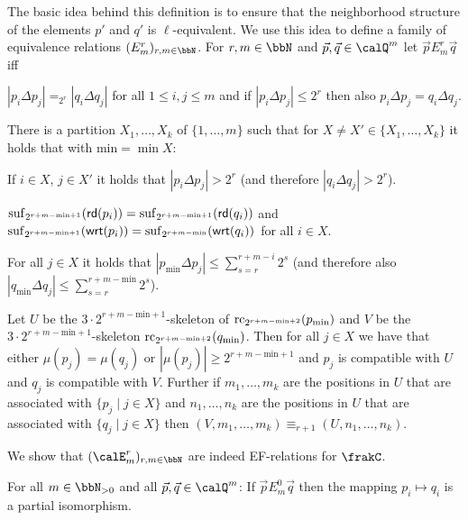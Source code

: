The basic idea behind this definition is to ensure that the neighborhood structure of the elements $p'$ and $q'$ is $\ell$-equivalent. We use this idea to  define a family of  equivalence relations $(E^r_m)_{r,m\in\bbN}$.
For $r,m\in \bbN$ and $\vec{p},\vec{q}\in \Qx^m$ let $\vec{p} E^r_m \vec{q}$ iff
\begin{bracketenumerate}
	\item\label{item:E_distance} $|p_i \Delta p_j| =_{2^r} |q_i\Delta q_j|$ for all $1\leq i, j\leq m$ and if $|p_i\Delta p_j| \leq 2^r$ then also $p_i \Delta p_j = q_i\Delta q_j$. 
	\item\label{item:E_partition} There is a partition $X_1,\ldots,X_k$ of $\{1,\ldots,m\}$ such that for $X\neq X'\in \{X_1,\ldots,X_k\}$ it holds that with $\text{min} = \min X$: 
	\begin{alphaenumerate}
		\item\label{item:part_distance} If $i\in X$, $j\in X'$ it holds that $|p_i\Delta p_j| > 2^r$ (and therefore $|q_i\Delta q_j| > 2^r$).
		\item\label{item:E_suffix} $\operatorname{suf}_{2^{r+m-\text{min}+1}}(\mathsf{rd}(p_i)) = \operatorname{suf}_{2^{r+m-\text{min}+1}}(\mathsf{rd}(q_i))$ and \\$\operatorname{suf}_{2^{r+m-\text{min}+1}}(\mathsf{wrt}(p_i)) = \operatorname{suf}_{2^{r+m-\text{min}}}(\mathsf{wrt}(q_i))$ for all $i\in X$.
		\item For all $j\in X$ it holds that $|p_\text{min} \Delta p_j| \leq \sum_{s= r}^{r+m-i} 2^s$ (and therefore also $|q_\text{min} \Delta q_j| \leq \sum_{s= r}^{r+m-\text{min}} 2^s$).
		\item\label{subitem:E_partition:equivalence} Let $U$ be the $3\cdot 2^{r+m-\text{min}+1}$-skeleton of $\operatorname{rc}_{2^{r+m-\text{min}+2}}(p_\text{min})$ and $V$ be the $3\cdot 2^{r+m-\text{min}+1}$-skeleton $\operatorname{rc}_{2^{r+m-\text{min}+2}}(q_\text{min})$. Then for all 
		$j\in X$ we have that either $\mu(p_j) = \mu(q_j)$ or $|\mu(p_j)| \geq 2^{r+m-\text{min}+1}$ and $p_j$ is compatible with $U$ and $q_j$ is compatible with $V$. Further if $m_1,\ldots, m_k$ are the positions in $U$ that are associated with $\{p_j \mid j\in X \}$ and $n_1,\ldots, n_k$ are the positions in $U$ that are associated with $\{q_j \mid j\in X \}$ then $(V,m_1,\ldots,m_k) \equiv_{r+1} (U,n_1,\ldots,n_k)$.
	\end{alphaenumerate}  
\end{bracketenumerate} 
We show that $(\calE^r_m)_{r,m\in\bbN}$ are indeed EF-relations for $\frakC$.
\begin{lemma}\label{lem:partial_isomorphism}
	For all $m\in\bbN_{>0}$ and all $\vec{p},\vec{q} \in \Qx^m$: If $\vec{p} E^0_m \vec{q}$ then the mapping $p_i \mapsto q_i$ is a partial isomorphism.
\end{lemma}
